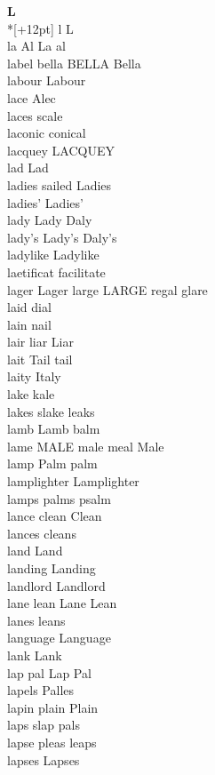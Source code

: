 \vspace{14pt}
\noindent\textbf{\Large L}\\*[+12pt]
l L\\
la Al La al\\
label bella BELLA Bella\\
labour Labour\\
lace Alec\\
laces scale\\
laconic conical\\
lacquey LACQUEY\\
lad Lad\\
ladies sailed Ladies\\
ladies' Ladies'\\
lady Lady Daly\\
lady's Lady's Daly's\\
ladylike Ladylike\\
laetificat facilitate\\
lager Lager large LARGE regal glare\\
laid dial\\
lain nail\\
lair liar Liar\\
lait Tail tail\\
laity Italy\\
lake kale\\
lakes slake leaks\\
lamb Lamb balm\\
lame MALE male meal Male\\
lamp Palm palm\\
lamplighter Lamplighter\\
lamps palms psalm\\
lance clean Clean\\
lances cleans\\
land Land\\
landing Landing\\
landlord Landlord\\
lane lean Lane Lean\\
lanes leans\\
language Language\\
lank Lank\\
lap pal Lap Pal\\
lapels Palles\\
lapin plain Plain\\
laps slap pals\\
lapse pleas leaps\\
lapses Lapses\\
